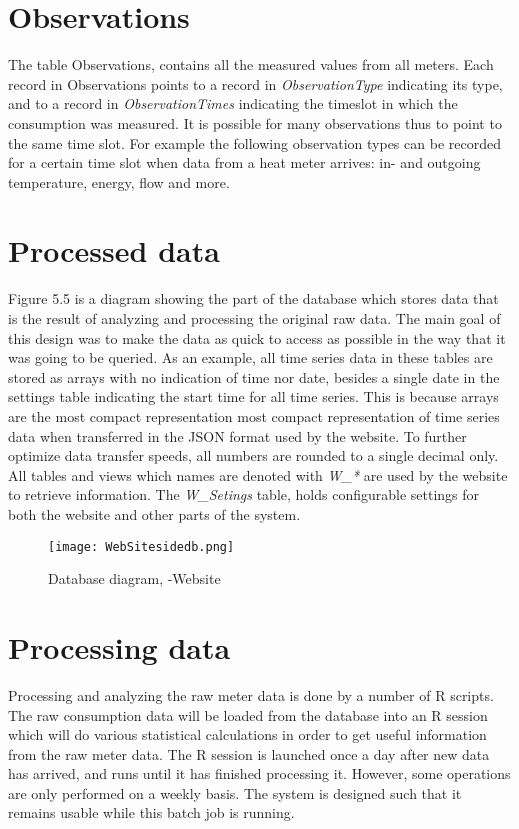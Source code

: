 \section*{Observations}
The table Observations, contains all the measured values from all meters. Each record in Observations points to a record in \emph{ObservationType} indicating its type, and to a record in \emph{ObservationTimes} indicating the timeslot in which the consumption was measured. It is possible for many observations thus to point to the same time slot. For example the following observation types can be recorded for a certain time slot when data from a heat meter arrives: in- and outgoing temperature, energy, flow and more.
\section*{Processed data}
Figure 5.5 is a diagram showing the part of the database which stores data that is the result of analyzing and processing the original raw data. The main goal of this design was to make the data as quick to access as possible in the way that it was going to be queried. As an example, all time series data in these tables are stored as arrays with no indication of time nor date, besides a single date in the settings table indicating the start time for all time series. This is because arrays are the most compact representation most compact representation of time series data when transferred in the JSON format used by the website. To further optimize data transfer speeds, all numbers are rounded to a single decimal only.
All tables and views which names are denoted with \emph{W\_*} are used by the website to retrieve information. The \emph{W\_Setings} table, holds configurable settings for both the website and other parts of the system.
\begin{figure}
\texttt{[image: WebSitesidedb.png]}
\caption{Database diagram, -Website}
\end{figure}
\section{Processing data}
Processing and analyzing the raw meter data is done by a number of R scripts. The raw consumption data will be loaded from the database into an R session which will do various statistical calculations in order to get useful information from the raw meter data. The R session is launched once a day after new data has arrived, and runs until it has finished processing it. However, some operations are only performed on a weekly basis. The system is designed such that it remains usable while this batch job is running.

